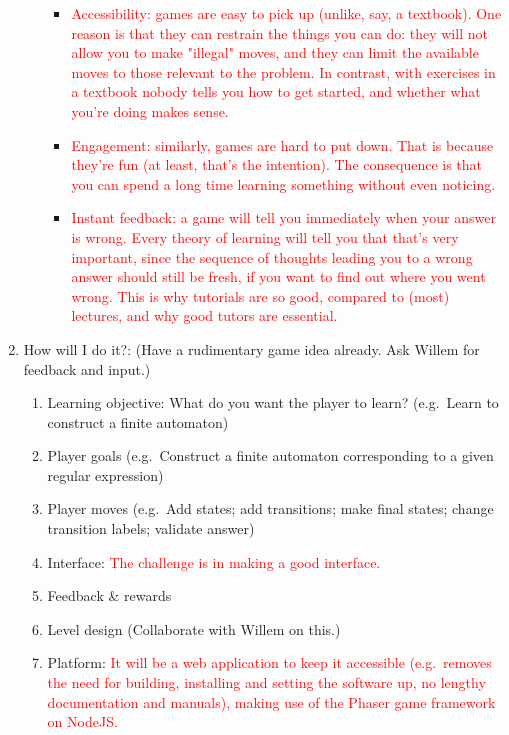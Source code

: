 \documentclass[a4paper,11pt]{article}
\newcommand{\draft}[1]{\textcolor{red}{#1}}
\begin{document}
\begin{enumerate}
\begin{itemize}
\begin{itemize}
        \item \draft{Accessibility: games are easy to pick up (unlike, say, a textbook). One reason is that they can restrain the things you can do: they will not allow you to make "illegal" moves, and they can limit the available moves to those relevant to the problem. In contrast, with exercises in a textbook nobody tells you how to get started, and whether what you're doing makes sense.}
        \item \draft{Engagement: similarly, games are hard to put down. That is because they're fun (at least, that's the intention). The consequence is that you can spend a long time learning something without even noticing.}
        \item \draft{Instant feedback: a game will tell you immediately when your answer is wrong. Every theory of learning will tell you that that's very important, since the sequence of thoughts leading you to a wrong answer should still be fresh, if you want to find out where you went wrong. This is why tutorials are so good, compared to (most) lectures, and why good tutors are essential.}
      \end{itemize}
    \end{itemize}
  \item How will I do it?: (Have a rudimentary game idea already. Ask Willem for feedback and input.)
    \begin{enumerate}
      \item Learning objective: What do you want the player to learn? (e.g.\ Learn to construct a finite automaton)
      \item Player goals (e.g.\ Construct a finite automaton corresponding to a given regular expression)
      \item Player moves (e.g.\ Add states; add transitions; make final states; change transition labels; validate answer)
      \item Interface: \draft{The challenge is in making a good interface.}
      \item Feedback \& rewards
      \item Level design (Collaborate with Willem on this.)
      \item Platform: \draft{It will be a web application to keep it accessible (e.g.\ removes the need for building, installing and setting the software up, no lengthy documentation and manuals), making use of the Phaser game framework on NodeJS.}
    \end{enumerate}
\end{enumerate}
\end{document}
